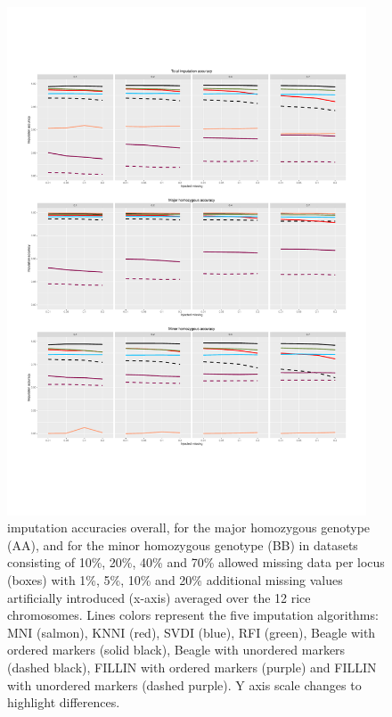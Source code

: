 \begin{figure}
\includegraphics[width=0.95\textwidth]{figure_rice_chrom.pdf}
\caption[Rice imputation accuracies]{
imputation accuracies overall, for the major homozygous genotype (AA), and for the minor homozygous genotype (BB) in datasets consisting of 10\%, 20\%, 40\% and 70\% allowed missing data per locus (boxes) with 1\%, 5\%, 10\% and 20\% additional missing values artificially introduced (x-axis) averaged over the 12 rice chromosomes. Lines colors represent the five imputation algorithms: MNI (salmon), KNNI (red), SVDI (blue), RFI (green), Beagle with ordered markers (solid black), Beagle with unordered markers (dashed black), FILLIN with ordered markers (purple) and FILLIN with unordered markers (dashed purple). Y axis scale changes to highlight differences.}
\label{fig:accuracy_rice}
\end{figure}

